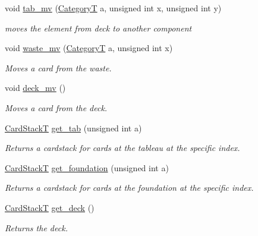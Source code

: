 \begin{DoxyCompactItemize}
void \mbox{\hyperlink{class_board_t_af55f68f106f0da464c9c5b9dc152f9a8}{tab\+\_\+mv}} (\mbox{\hyperlink{_card_types_8h_aa77f81f8d4c8aa57046a50ca32d6b7b4}{CategoryT}} a, unsigned int x, unsigned int y)
\begin{DoxyCompactList}\small\item\em moves the element from deck to another component \end{DoxyCompactList}\item 
void \mbox{\hyperlink{class_board_t_a21ec6e033ae6a5258a3bfac7389e367d}{waste\+\_\+mv}} (\mbox{\hyperlink{_card_types_8h_aa77f81f8d4c8aa57046a50ca32d6b7b4}{CategoryT}} a, unsigned int x)
\begin{DoxyCompactList}\small\item\em Moves a card from the waste. \end{DoxyCompactList}\item 
\mbox{\label{class_board_t_a548e3e518666a6f38b49e072a88a6d2c}} 
void \mbox{\hyperlink{class_board_t_a548e3e518666a6f38b49e072a88a6d2c}{deck\+\_\+mv}} ()
\begin{DoxyCompactList}\small\item\em Moves a card from the deck. \end{DoxyCompactList}\item 
\mbox{\hyperlink{_card_stack_8h_a29a6854caf5fec306ee8fc0c6b453837}{Card\+StackT}} \mbox{\hyperlink{class_board_t_a70509bcb23b26d594aff5d2f9b81cab3}{get\+\_\+tab}} (unsigned int a)
\begin{DoxyCompactList}\small\item\em Returns a cardstack for cards at the tableau at the specific index. \end{DoxyCompactList}\item 
\mbox{\hyperlink{_card_stack_8h_a29a6854caf5fec306ee8fc0c6b453837}{Card\+StackT}} \mbox{\hyperlink{class_board_t_a5167cf5c067a7f4601ed011d329c9846}{get\+\_\+foundation}} (unsigned int a)
\begin{DoxyCompactList}\small\item\em Returns a cardstack for cards at the foundation at the specific index. \end{DoxyCompactList}\item 
\mbox{\hyperlink{_card_stack_8h_a29a6854caf5fec306ee8fc0c6b453837}{Card\+StackT}} \mbox{\hyperlink{class_board_t_a2f28e0a5e9c34f396e2aebc79342a225}{get\+\_\+deck}} ()
\begin{DoxyCompactList}\small\item\em Returns the deck. \end{DoxyCompactList}\item 

\end{DoxyCompactItemize}
